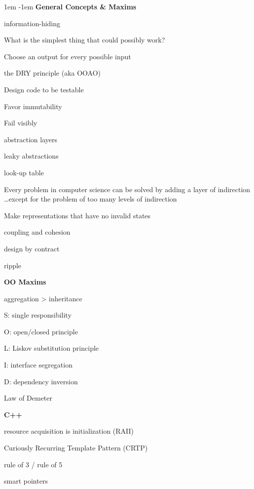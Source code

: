 \documentclass[12pt]{article}
\newenvironment{col3}
  {\begin{minipage}[t]{0.3\textwidth}
   \fontsize{10}{12}\selectfont
   \raggedright
   \leftskip 1em
   \parindent -1em}
  {\end{minipage}}
\newcommand{\hd}[1]{\vspace{\baselineskip}\textbf{#1}\vspace{0.1em}}
\begin{document}
\begin{col3}
\hd{General Concepts \& Maxims}

information-hiding

What is the simplest thing that could possibly work?

Choose an output for every possible input

the DRY principle (aka OOAO)

Design code to be testable

Favor immutability

Fail visibly

abstraction layers

leaky abstractions

look-up table

Every problem in computer science can be solved by adding a layer of indirection
…except for the problem of too many levels of indirection

Make representations that have no invalid states


coupling and cohesion


design by contract

ripple


\hd{OO Maxims}

aggregation > inheritance

S: single responsibility

O: open/closed principle

L: Liskov substitution principle

I: interface segregation

D: dependency inversion

Law of Demeter

\hd{C++}

resource acquisition is initialization (RAII)

Curiously Recurring Template Pattern (CRTP)

rule of 3 / rule of 5

smart pointers
\end{col3}
\hfill
\end{document}
